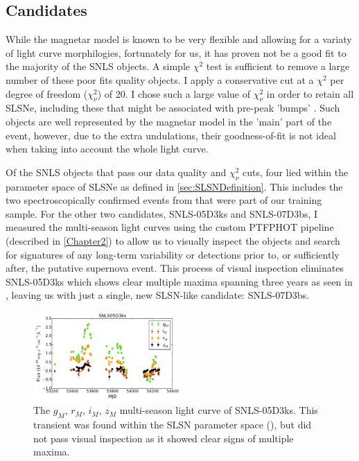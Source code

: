 \subsection{Candidates}
\label{sec:SLSNCands}
While the magnetar model is known to be very flexible and allowing for a variaty of light curve morphilogies, fortunately for us, it has proven not be a good fit to the majority of the SNLS objects. A simple $\chi^2$ test is sufficient to remove a large number of these poor fits quality objects. I apply a conservative cut at a $\chi^2$ per degree of freedom ($\chi^2_{\nu}$) of 20. I chose such a large value of $\chi^2_{\nu}$ in order to retain all SLSNe, including these that might be associated with pre-peak 'bumps' \citep{Nicolls2016,Nicolls2015a,Smith2016}. Such objects are well represented by the magnetar model in the 'main' part of the event, however, due to the extra undulations, their goodness-of-fit is not ideal when taking into account the whole light curve.

Of the SNLS objects that pass our data quality and $\chi^2_{\nu}$ cuts, four lied within the parameter space of SLSNe as defined in \ref{sec:SLSNDefinition}. This includes the two spectroscopically confirmed events from \citet{Howell2013} that were part of our training sample. For the other two candidates, SNLS-05D3ks and SNLS-07D3bs, I  measured the multi-season light curves using the custom \textsc{PTFPHOT} pipeline (described in \cref{Chapter2}) to allow us to visually inspect the objects and search for signatures of any long-term variability or detections prior to, or sufficiently after, the putative supernova event. This process of visual inspection eliminates SNLS-05D3ks which shows clear multiple maxima spanning three years as seen in , leaving us with just a single, new SLSN-like candidate: SNLS-07D3bs.

\begin{figure}
\centering
\includegraphics[width=0.5\textwidth]{Figures/Chapter3/SNLS05D3ks}
\caption{The $g_M$, $r_M$, $i_M$, $z_M$ multi-season light curve of SNLS-05D3ks. This transient was found within the SLSN parameter space (), but did not pass visual inspection as it showed clear signs of multiple maxima.}
\label{fig:05D3ks}
\end{figure}

